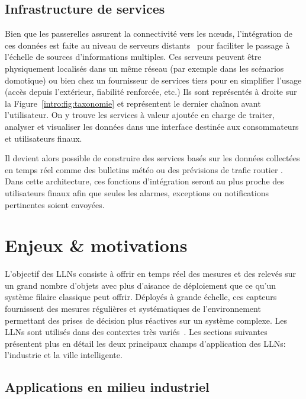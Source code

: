 \subsection{Infrastructure de services}

Bien que les passerelles assurent la connectivité vers les nœuds, l'intégration de ces données est faite au niveau de serveurs distants~\cite{anton2014machine, atzori2010internet} pour faciliter le passage à l'échelle de sources d'informations multiples.
Ces serveurs peuvent être physiquement localisés dans un même réseau (par exemple dans les scénarios domotique) ou bien chez un fournisseur de services tiers pour en simplifier l'usage (accès depuis l'extérieur, fiabilité renforcée, etc.)
Ils sont représentés à droite sur la Figure~\ref{intro:fig:taxonomie} et représentent le dernier chaînon avant l'utilisateur.
On y trouve les services à valeur ajoutée en charge de traiter, analyser et visualiser les données dans une interface destinée aux consommateurs et utilisateurs finaux.

Il devient alors possible de construire des services basés sur les données collectées en temps réel comme des bulletins météo ou des prévisions de trafic routier \cite{hart2006environmental, gubbi2013internet}.
Dans cette architecture, ces fonctions d'intégration seront au plus proche des utilisateurs finaux afin que seules les alarmes, exceptions ou notifications pertinentes soient envoyées.

\section{Enjeux \& motivations}
\label{intro:motivations}

L'objectif des \ac{LLN}s consiste à offrir en temps réel des mesures et des relevés sur un grand nombre d'objets avec plus d'aisance de déploiement que ce qu'un système filaire classique peut offrir.
Déployés à grande échelle, ces capteurs fournissent des mesures régulières et systématiques de l'environnement permettant des prises de décision plus réactives sur un système complexe.
Les \ac{LLN}s sont utilisés dans des contextes très variés~\cite{anton2014machine, atzori2010internet}.
Les sections suivantes présentent plus en détail les deux principaux champs d'application des \ac{LLN}s: l'industrie et la ville intelligente.

\subsection{Applications en milieu industriel}

